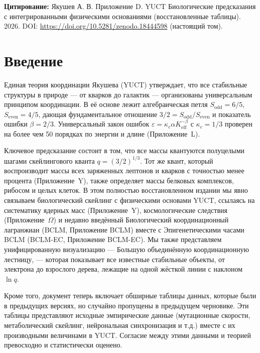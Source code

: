 \documentclass[11pt,a4paper]{article}
\begin{document}
	\vspace{0.1cm}
	\noindent
	\textbf{Цитирование:} Якушев А. В. Приложение D. YUCT Биологические предсказания с интегрированными физическими основаниями (восстановленные таблицы). 2026. DOI: \url{https://doi.org/10.5281/zenodo.18444598} (настоящий том).
	
	\tableofcontents
	\newpage
	
	\section{Введение}
	
	Единая теория координации Якушева (YUCT) утверждает, что все стабильные структуры в природе — от кварков до галактик — организованы универсальным принципом координации. В её основе лежит алгебраическая петля \(S_{\mathrm{odd}} = 6/5\), \(S_{\mathrm{even}} = 4/5\), дающая фундаментальное отношение \(3/2 = S_{\mathrm{odd}}/S_{\mathrm{even}}\) и показатель ошибки \(\beta = 2/3\). Универсальный закон ошибок \(\varepsilon = \kappa_c \alpha K_{\mathrm{eff}}^{-\beta}\) с \(\kappa_c = 1/3\) проверен на более чем 50 порядках по энергии и длине (Приложение~L).
	
	Ключевое предсказание состоит в том, что все массы квантуются полуцелыми шагами скейлингового кванта \(q = (3/2)^{1/3}\). Тот же квант, который воспроизводит массы всех заряженных лептонов и кварков с точностью менее процента (Приложение~Y), также определяет массы белковых комплексов, рибосом и целых клеток. В этом полностью восстановленном издании мы явно связываем биологический скейлинг с физическими основами YUCT, ссылаясь на систематику ядерных масс (Приложение~Y), космологические следствия (Приложение~\(\Omega\)) и недавно введённый Биологический координационный лагранжиан (BCLM, Приложение BCLM) вместе с Эпигенетическими часами BCLM (BCLM-EC, Приложение BCLM-EC). Мы также представляем унифицированную визуализацию — Большую объединённую координационную лестницу, — которая показывает все известные стабильные объекты, от электрона до взрослого дерева, лежащие на одной жёсткой линии с наклоном \(\ln q\).
	
	Кроме того, документ теперь включает обширные таблицы данных, которые были в предыдущих версиях, но случайно пропущены в предыдущем черновике. Эти таблицы представляют исходные эмпирические данные (мутационные скорости, метаболический скейлинг, нейрональная синхронизация и т.д.) вместе с их производными величинами в YUCT. Согласие между этими данными и теорией превосходно и статистически оценено.
	
\end{document}
